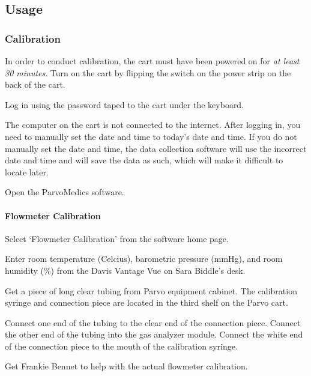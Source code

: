 \documentclass[
]{book}
\begin{document}
\hypertarget{Appendix-Instruments-Parvo-Usage}{%
\subsection{Usage}\label{Appendix-Instruments-Parvo-Usage}}

\hypertarget{Appendix-Instruments-Parvo-Usage-Calibration}{%
\subsubsection{Calibration}\label{Appendix-Instruments-Parvo-Usage-Calibration}}

In order to conduct calibration, the cart must have been powered on for \emph{at least 30 minutes}.
Turn on the cart by flipping the switch on the power strip on the back of the cart.

Log in using the password taped to the cart under the keyboard.

The computer on the cart is not connected to the internet. After logging in, you need to manually set the date and time to today's date and time. If you do not manually set the date and time, the data collection software will use the incorrect date and time and will save the data as such, which will make it difficult to locate later.

Open the ParvoMedics software.

\hypertarget{Appendix-Instruments-Parvo-Usage-Calibration-Flowmeter}{%
\paragraph{Flowmeter Calibration}\label{Appendix-Instruments-Parvo-Usage-Calibration-Flowmeter}}

Select `Flowmeter Calibration' from the software home page.

Enter room temperature (Celcius), barometric pressure (mmHg), and room humidity (\%) from the Davis Vantage Vue on Sara Biddle's desk.

Get a piece of long clear tubing from Parvo equipment cabinet. The calibration syringe and connection piece are located in the third shelf on the Parvo cart.

Connect one end of the tubing to the clear end of the connection piece. Connect the other end of the tubing into the gas analyzer module. Connect the white end of the connection piece to the mouth of the calibration syringe.

Get Frankie Bennet to help with the actual flowmeter calibration.
\end{document}
